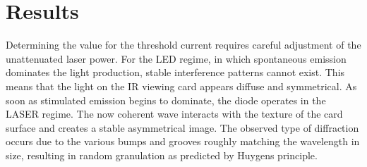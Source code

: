 \section{Results}
\label{sec:results}

Determining the value for the threshold current requires careful adjustment of the unattenuated laser power. For the LED regime,
in which spontaneous emission dominates the light production, stable interference patterns cannot exist. This means that the
light on the IR viewing card appears diffuse and symmetrical. As soon as stimulated emission begins to dominate, the diode
operates in the LASER regime. The now coherent wave interacts with the texture of the card surface and creates a stable asymmetrical
image. The observed type of diffraction occurs due to the various bumps and grooves roughly matching the wavelength in size, resulting
in random granulation as predicted by Huygens principle. 

